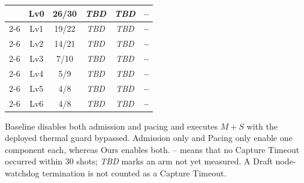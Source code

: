\begin{table}[t]
{{\begin{tabular}{|c|c||c|c|c|c|}
      & Lv0 & 26/30 & \textit{TBD} & \textit{TBD} & \textbf{--} \\
    \cline{2-6}
      & Lv1 & 19/22 & \textit{TBD} & \textit{TBD} & \textbf{--} \\
    \cline{2-6}
      & Lv2 & 14/21 & \textit{TBD} & \textit{TBD} & \textbf{--} \\
    \cline{2-6}
      & Lv3 & 7/10  & \textit{TBD} & \textit{TBD} & \textbf{--} \\
    \cline{2-6}
      & Lv4 & 5/9   & \textit{TBD} & \textit{TBD} & \textbf{--} \\
    \cline{2-6}
      & Lv5 & 4/8   & \textit{TBD} & \textit{TBD} & \textbf{--} \\
    \cline{2-6}
      & Lv6 & 4/8   & \textit{TBD} & \textit{TBD} & \textbf{--} \\
    \hline\hline
  \end{tabular}}%
  \rqonebtabular
  }

  \par\vspace{3pt}
  {\scriptsize
  Baseline disables both admission and pacing and executes $M{+}S$ with the
  deployed thermal guard bypassed.  Admission only and Pacing only enable one
  component each, whereas Ours enables both.  -- means that no Capture Timeout
  occurred within 30 shots; \textit{TBD} marks an arm not yet measured.  A
  Draft node-watchdog termination is not counted as a Capture Timeout.}
\end{table}
